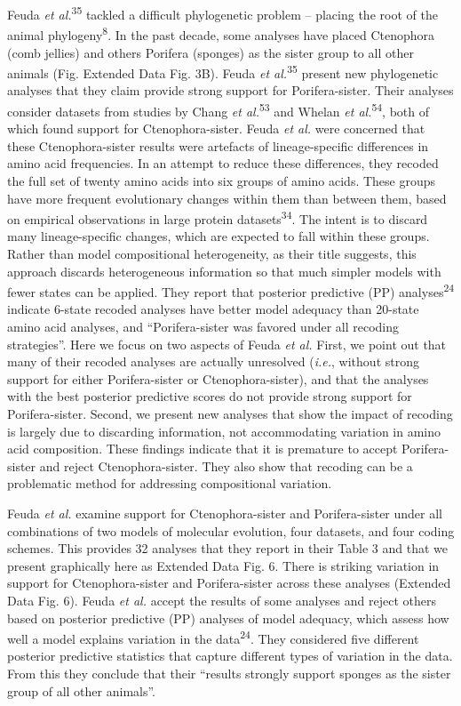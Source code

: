 \documentclass[]{article}
\begin{document}
Feuda \emph{et al.}\textsuperscript{35} tackled a difficult phylogenetic
problem -- placing the root of the animal phylogeny\textsuperscript{8}.
In the past decade, some analyses have placed Ctenophora (comb jellies)
and others Porifera (sponges) as the sister group to all other animals
(Fig. Extended Data Fig. 3B). Feuda \emph{et al.}\textsuperscript{35}
present new phylogenetic analyses that they claim provide strong support
for Porifera-sister. Their analyses consider datasets from studies by
Chang \emph{et al.}\textsuperscript{53} and Whelan \emph{et
al.}\textsuperscript{54}, both of which found support for
Ctenophora-sister. Feuda \emph{et al.} were concerned that these
Ctenophora-sister results were artefacts of lineage-specific differences
in amino acid frequencies. In an attempt to reduce these differences,
they recoded the full set of twenty amino acids into six groups of amino
acids. These groups have more frequent evolutionary changes within them
than between them, based on empirical observations in large protein
datasets\textsuperscript{34}. The intent is to discard many
lineage-specific changes, which are expected to fall within these
groups. Rather than model compositional heterogeneity, as their title
suggests, this approach discards heterogeneous information so that much
simpler models with fewer states can be applied. They report that
posterior predictive (PP) analyses\textsuperscript{24} indicate 6-state
recoded analyses have better model adequacy than 20-state amino acid
analyses, and ``Porifera-sister was favored under all recoding
strategies''. Here we focus on two aspects of Feuda \emph{et al.} First,
we point out that many of their recoded analyses are actually unresolved
(\emph{i.e.}, without strong support for either Porifera-sister or
Ctenophora-sister), and that the analyses with the best posterior
predictive scores do not provide strong support for Porifera-sister.
Second, we present new analyses that show the impact of recoding is
largely due to discarding information, not accommodating variation in
amino acid composition. These findings indicate that it is premature to
accept Porifera-sister and reject Ctenophora-sister. They also show that
recoding can be a problematic method for addressing compositional
variation.

Feuda \emph{et al.} examine support for Ctenophora-sister and
Porifera-sister under all combinations of two models of molecular
evolution, four datasets, and four coding schemes. This provides 32
analyses that they report in their Table 3 and that we present
graphically here as Extended Data Fig. 6. There is striking variation in
support for Ctenophora-sister and Porifera-sister across these analyses
(Extended Data Fig. 6). Feuda \emph{et al.} accept the results of some
analyses and reject others based on posterior predictive (PP) analyses
of model adequacy, which assess how well a model explains variation in
the data\textsuperscript{24}. They considered five different posterior
predictive statistics that capture different types of variation in the
data. From this they conclude that their ``results strongly support
sponges as the sister group of all other animals''.
\end{document}
